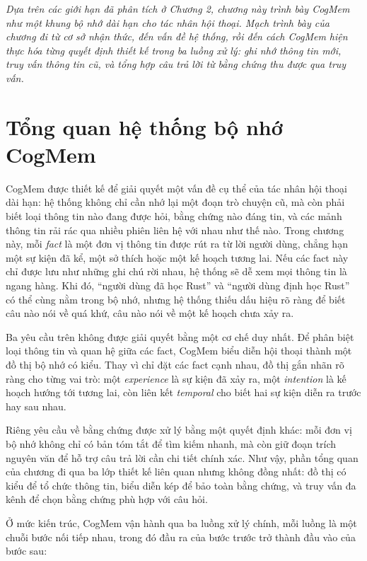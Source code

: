 \documentclass[../main.tex]{subfiles}
\begin{document}
\textit{Dựa trên các giới hạn đã phân tích ở Chương 2, chương này trình bày CogMem như một khung bộ nhớ dài hạn cho tác nhân hội thoại. Mạch trình bày của chương đi từ cơ sở nhận thức, đến vấn đề hệ thống, rồi đến cách CogMem hiện thực hóa từng quyết định thiết kế trong ba luồng xử lý: ghi nhớ thông tin mới, truy vấn thông tin cũ, và tổng hợp câu trả lời từ bằng chứng thu được qua truy vấn.}

\section{Tổng quan hệ thống bộ nhớ CogMem}

CogMem được thiết kế để giải quyết một vấn đề cụ thể của tác nhân hội thoại dài hạn: hệ thống không chỉ cần nhớ lại một đoạn trò chuyện cũ, mà còn phải biết loại thông tin nào đang được hỏi, bằng chứng nào đáng tin, và các mảnh thông tin rải rác qua nhiều phiên liên hệ với nhau như thế nào. Trong chương này, mỗi \textit{fact} là một đơn vị thông tin được rút ra từ lời người dùng, chẳng hạn một sự kiện đã kể, một sở thích hoặc một kế hoạch tương lai. Nếu các fact này chỉ được lưu như những ghi chú rời nhau, hệ thống sẽ dễ xem mọi thông tin là ngang hàng. Khi đó, ``người dùng đã học Rust'' và ``người dùng định học Rust'' có thể cùng nằm trong bộ nhớ, nhưng hệ thống thiếu dấu hiệu rõ ràng để biết câu nào nói về quá khứ, câu nào nói về một kế hoạch chưa xảy ra.

Ba yêu cầu trên không được giải quyết bằng một cơ chế duy nhất. Để phân biệt loại thông tin và quan hệ giữa các fact, CogMem biểu diễn hội thoại thành một đồ thị bộ nhớ có kiểu. Thay vì chỉ đặt các fact cạnh nhau, đồ thị gắn nhãn rõ ràng cho từng vai trò: một \textit{experience} là sự kiện đã xảy ra, một \textit{intention} là kế hoạch hướng tới tương lai, còn liên kết \textit{temporal} cho biết hai sự kiện diễn ra trước hay sau nhau.

Riêng yêu cầu về bằng chứng được xử lý bằng một quyết định khác: mỗi đơn vị bộ nhớ không chỉ có bản tóm tắt để tìm kiếm nhanh, mà còn giữ đoạn trích nguyên văn để hỗ trợ câu trả lời cần chi tiết chính xác. Như vậy, phần tổng quan của chương đi qua ba lớp thiết kế liên quan nhưng không đồng nhất: đồ thị có kiểu để tổ chức thông tin, biểu diễn kép để bảo toàn bằng chứng, và truy vấn đa kênh để chọn bằng chứng phù hợp với câu hỏi.

Ở mức kiến trúc, CogMem vận hành qua ba luồng xử lý chính, mỗi luồng là một chuỗi bước nối tiếp nhau, trong đó đầu ra của bước trước trở thành đầu vào của bước sau:
\end{document}
